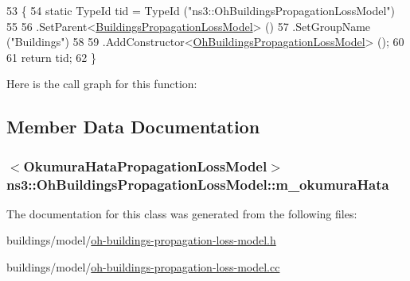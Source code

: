\begin{DoxyCode}
53 \{
54   \textcolor{keyword}{static} TypeId tid = TypeId (\textcolor{stringliteral}{"ns3::OhBuildingsPropagationLossModel"})
55   
56   .SetParent<\hyperlink{classns3_1_1BuildingsPropagationLossModel_ab23ac72e775bd5e1d4ee4720e73761c0}{BuildingsPropagationLossModel}> ()
57   .SetGroupName (\textcolor{stringliteral}{"Buildings"})
58   
59   .AddConstructor<\hyperlink{classns3_1_1OhBuildingsPropagationLossModel_ada271b69a1512e6c8659f2f19c4794ad}{OhBuildingsPropagationLossModel}> ();
60   
61   \textcolor{keywordflow}{return} tid;
62 \}
\end{DoxyCode}


Here is the call graph for this function\+:




\subsection{Member Data Documentation}
\subsubsection[{\texorpdfstring{m\+\_\+okumura\+Hata}{m_okumuraHata}}]{$<${\bf Okumura\+Hata\+Propagation\+Loss\+Model}$>$ ns3\+::\+Oh\+Buildings\+Propagation\+Loss\+Model\+::m\+\_\+okumura\+Hata\hspace{0.3cm}{\ttfamily [private]}}\hypertarget{classns3_1_1OhBuildingsPropagationLossModel_a1931526744ccd71a92eb64b321129c1b}{}\label{classns3_1_1OhBuildingsPropagationLossModel_a1931526744ccd71a92eb64b321129c1b}


The documentation for this class was generated from the following files\+:\begin{DoxyCompactItemize}
\item 
buildings/model/\hyperlink{oh-buildings-propagation-loss-model_8h}{oh-\/buildings-\/propagation-\/loss-\/model.\+h}\item 
buildings/model/\hyperlink{oh-buildings-propagation-loss-model_8cc}{oh-\/buildings-\/propagation-\/loss-\/model.\+cc}\end{DoxyCompactItemize}
